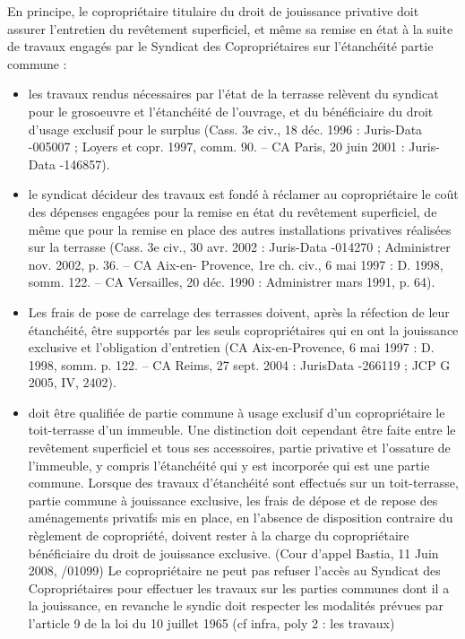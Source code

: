 			En principe, le copropriétaire titulaire du droit de jouissance privative doit assurer l’entretien du
			revêtement superficiel, et même sa remise en état à la suite de travaux engagés par le Syndicat des
			Copropriétaires sur l’étanchéité partie commune :
			\begin{itemize}
				\item les travaux rendus nécessaires par l'état de la terrasse relèvent du syndicat pour le grosoeuvre
				et l'étanchéité de l'ouvrage, et du bénéficiaire du droit d'usage exclusif pour le surplus
				(Cass. 3e civ., 18 déc. 1996 : Juris-Data -005007 ; Loyers et copr. 1997, comm. 90. –
				CA Paris, 20 juin 2001 : Juris-Data -146857).
				\item le syndicat décideur des travaux est fondé à réclamer au copropriétaire le coût des
				dépenses engagées pour la remise en état du revêtement superficiel, de même que pour la
				remise en place des autres installations privatives réalisées sur la terrasse (Cass. 3e civ.,
				30 avr. 2002 : Juris-Data -014270 ; Administrer nov. 2002, p. 36. – CA Aix-en-
				Provence, 1re ch. civ., 6 mai 1997 : D. 1998, somm. 122. – CA Versailles, 20 déc. 1990 :
				Administrer mars 1991, p. 64).
				\item Les frais de pose de carrelage des terrasses doivent, après la réfection de leur étanchéité, être
				supportés par les seuls copropriétaires qui en ont la jouissance exclusive et l'obligation
				d'entretien (CA Aix-en-Provence, 6 mai 1997 : D. 1998, somm. p. 122. – CA Reims, 27 sept.
				2004 : JurisData -266119 ; JCP G 2005, IV, 2402).
				\item doit être qualifiée de partie commune à usage exclusif d'un copropriétaire le toit-terrasse
				d'un immeuble. Une distinction doit cependant être faite entre le revêtement superficiel et
				tous ses accessoires, partie privative et l'ossature de l'immeuble, y compris l'étanchéité qui y
				est incorporée qui est une partie commune. Lorsque des travaux d'étanchéité sont effectués
				sur un toit-terrasse, partie commune à jouissance exclusive, les frais de dépose et de repose
				des aménagements privatifs mis en place, en l'absence de disposition contraire du règlement
				de copropriété, doivent rester à la charge du copropriétaire bénéficiaire du droit de
				jouissance exclusive. (Cour d'appel Bastia, 11 Juin 2008, /01099)
				Le copropriétaire ne peut pas refuser l’accès au Syndicat des Copropriétaires pour effectuer les travaux
				sur les parties communes dont il a la jouissance, en revanche le syndic doit respecter les modalités prévues
				par l’article 9 de la loi du 10 juillet 1965 (cf infra, poly 2 : les travaux)
			\end{itemize}
		
